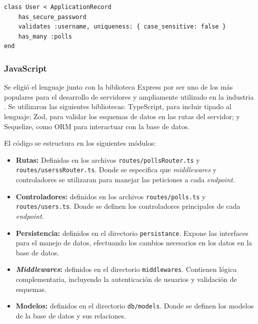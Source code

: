 \documentclass[11pt]{article}
\let\Oldsubsubsection\subsubsection
\renewcommand{\subsubsection}{\FloatBarrier\Oldsubsubsection}
\newcommand{\english}[1]{\textit{#1}}
\begin{document}
\begin{listing}
\begin{verbatim}
class User < ApplicationRecord
    has_secure_password
    validates :username, uniqueness: { case_sensitive: false }
    has_many :polls
end
\end{verbatim}
\caption{Definición del Modelo \lstinline{User} en Ruby on Rails}
\label{code:http:ruby_user_model}
\end{listing}

\subsubsection{JavaScript}

Se eligió el lenguaje junto con la biblioteca Express por ser uno de los más populares para el desarrollo de servidores y ampliamente utilizado en la industria \cite{http:web_frameworks_survey}. Se utilizaron las siguientes bibliotecas: TypeScript, para incluir tipado al lenguaje; Zod, para validar los esquemas de datos en las rutas del servidor; y Sequelize, como ORM para interactuar con la base de datos.

El código se estructura en los siguientes módulos:

\begin{itemize}
    \item \textbf{Rutas:} Definidas en los archivos \lstinline{routes/pollsRouter.ts} y \lstinline{routes/userssRouter.ts}. Donde se especifica que \english{middlewares} y controladores se utilizaran para manejar las peticiones a cada \english{endpoint}.
    
    \item \textbf{Controladores:} definidos en los archivos \lstinline{routes/polls.ts} y \lstinline{routes/users.ts}. Donde se definen los controladores principales de cada \english{endpoint}.

    \item \textbf{Persistencia:} definidos en el directorio \lstinline{persistance}. Expone las interfaces para el manejo de datos, efectuando los cambios necesarios en los datos en la base de datos.
    
    \item \textbf{\english{Middlewares}:} definidos en el directorio \lstinline{middlewares}. Contienen lógica complementaria, incluyendo la autenticación de usuarios y validación de esquemas.
    
    \item \textbf{Modelos:} definidos en el directorio \lstinline{db/models}. Donde se definen los modelos de la base de datos y sus relaciones.
\end{itemize}
\end{document}
